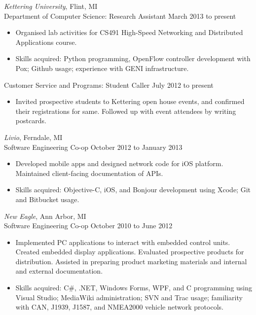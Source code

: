 \documentclass{res}
\begin{document}
\begin{resume}
{\sl Kettering University}, Flint, MI \\
Department of Computer Science: Research Assistant \hfill March 2013 to present

   \begin{itemize} \itemsep -2pt
   \item Organised lab activities for CS491 High-Speed Networking and 
   Distributed Applications course.
   \item Skills acquired: Python programming, OpenFlow controller development
         with Pox; Github usage; experience with GENI infrastructure.
   \end{itemize}
Customer Service and Programs: Student Caller \hfill July 2012 to present

   \begin{itemize} \itemsep -2pt
   \item Invited prospective students to Kettering open house events, and 
   confirmed their registrations for same. 
         Followed up with event attendees by writing postcards.
   \end{itemize} 

   
{\sl Livio}, Ferndale, MI \\
Software Engineering Co-op       \hfill   October 2012 to January 2013
  
   \begin{itemize} \itemsep -2pt %
   \item Developed mobile apps and designed network code for iOS platform.
         Maintained client-facing documentation of APIs. 
   \item Skills acquired: Objective-C, iOS, and Bonjour development using Xcode;
   Git and Bitbucket usage.
   \end{itemize}

{\sl New Eagle}, Ann Arbor, MI \\
Software Engineering Co-op \hfill October 2010 to June 2012

   \begin{itemize} \itemsep -2pt
   \item Implemented PC applications to interact with embedded control units.
            Created embedded display applications.
            Evaluated prospective products for distribution.
            Assisted in preparing product marketing materials and internal and 
            external documentation.
   \item Skills acquired: C\#, .NET, Windows Forms, WPF, and C programming using
         Visual Studio; MediaWiki administration; SVN and Trac usage; 
         familiarity with CAN, J1939, J1587, and NMEA2000 vehicle network protocols.
   \end{itemize} 


\end{resume}
\end{document}
